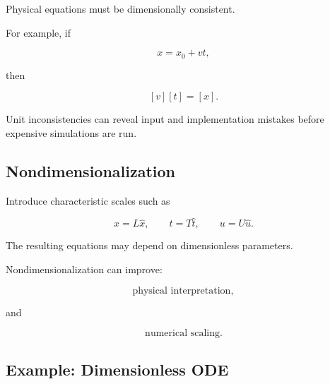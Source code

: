 Physical equations must be dimensionally consistent.

For example, if

\[
x
=
x_0
+
vt,
\]

then

\[
[v][t]
=
[x].
\]

Unit inconsistencies can reveal input and implementation mistakes before
expensive simulations are run.

\subsection{Nondimensionalization}
\label{subsec:scientific-nondimensionalization}

Introduce characteristic scales such as

\[
x=L\widehat{x},
\qquad
t=T\widehat{t},
\qquad
u=U\widehat{u}.
\]

The resulting equations may depend on dimensionless parameters.

Nondimensionalization can improve:

\[
\boxed{
\text{physical interpretation},
}
\]

and

\[
\boxed{
\text{numerical scaling}.
}
\]

\subsection{Example: Dimensionless ODE}
\label{subsec:worked-dimensionless-ode}


